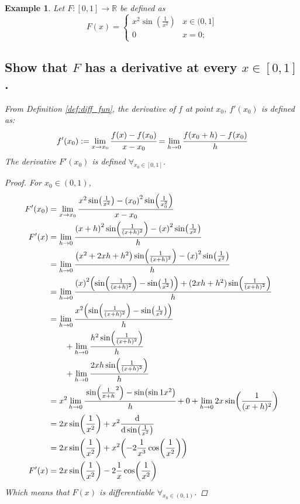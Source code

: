 \documentclass[]{article}
\newcommand{\R}{\mathbb{R}}
\newtheorem{example}{Example}
\begin{document}
\begin{example}
    Let $F : [0,1] \to \R$ be defined as\[
        F(x) = \begin{cases}
            x^2 \sin(\frac{1}{x^2}) & x \in (0,1]\\
            0 & x = 0;
        \end{cases}
    \]
    \subsection{Show that $F$ has a derivative at every $x\in [0,1]$.}
    From Definition \ref{def:diff_fun}, the derivative of $f$ at point $x_0$, $f'(x_0)$ is defined as:\[
        f'(x_0) := \lim_{x \to x_0} \cfrac{f(x) - f(x_0)}{x - x_0}
        = \lim_{h \to 0} \cfrac{f(x_0+h) - f(x_0)}{h}
    \]
    The derivative $F'(x_0)$ is defined $\forall_{x_0 \in [0,1]}$.
    \begin{proof}
        For $x_0 \in (0,1)$,\begin{align*}
            F'(x_0) 
                &= \lim_{x \to x_0} \cfrac{
                    x^2 \sin(\frac{1}{x^2}) - \qty(x_0)^2 \sin(\frac{1}{x_0^2})
                }{x - x_0}\\
            F'(x)
                &= \lim_{h \to 0} \cfrac{
                    \qty(x+h)^2 \sin(\frac{1}{(x+h)^2}) - \qty(x)^2 \sin(\frac{1}{x^2})
                }{h}\\
                &= \lim_{h \to 0} \cfrac{
                    \qty(x^2 + 2 xh + h^2) \sin(\frac{1}{(x+h)^2}) - \qty(x)^2 \sin(\frac{1}{x^2})
                }{h}\\
                &= \lim_{h \to 0} \cfrac{
                    \qty(x)^2 \qty(\sin(\frac{1}{(x+h)^2}) - \sin(\frac{1}{x^2})) + (2 xh + h^2) \sin(\frac{1}{(x+h)^2})
                }{h}\\
                &= \lim_{h \to 0} \cfrac{x^2 \qty(\sin(\frac{1}{(x+h)^2}) - \sin(\frac{1}{x^2}))}{h}\\
                    &\qquad + \lim_{h \to 0} \cfrac{h^2 \sin(\frac{1}{(x+h)^2})}{h}\\
                    &\qquad + \lim_{h \to 0} \cfrac{2 x h \sin(\frac{1}{(x+h)^2})}{h}\\
                &= x^2 \lim_{h \to 0} \cfrac{\sin(\frac{1}{x+h}^2) - \sin(\sin{1}{x^2})}{h}
                    + 0 + \lim_{h \to 0} 2 x \sin(\frac{1}{(x+h)^2})\\
                &= 2 x \sin(\frac{1}{x^2}) + x^2 \dv{\sin(\frac{1}{x^2})}\\
                &= 2 x \sin(\frac{1}{x^2}) + x^2 \qty(-2\frac{1}{x^3} \cos(\frac{1}{x^2}))\\
            F'(x)
                &= 2 x \sin(\frac{1}{x^2}) - 2 \frac{1}{x} \cos(\frac{1}{x^2})
        \end{align*}
        Which means that $F(x)$ is differentiable $\forall_{x_0 \in (0,1)}$.


\end{proof}
\end{example}
\end{document}
